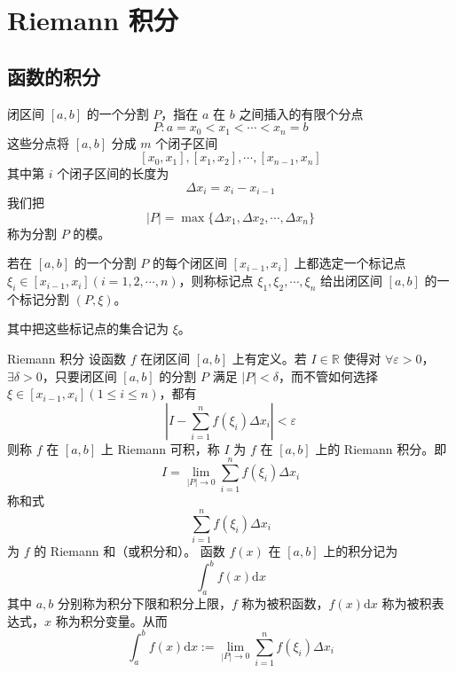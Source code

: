 \chapter{Riemann 积分}


\section{函数的积分}

\begin{definition}
    闭区间 $[a, b]$ 的一个分割 $P$，指在 $a$ 在 $b$ 之间插入的有限个分点
    \[P : a = x_0 < x_1 < \cdots < x_n = b\]
    这些分点将 $[a, b]$ 分成 $m$ 个闭子区间
    \[[x_0,x_1],[x_1,x_2],\cdots,[x_{n -1},x_n]\]
    其中第 $i$ 个闭子区间的长度为
    \[\Delta x_i = x_i - x_{i - 1}\]
    我们把
    \[|P| = \max\{\Delta x_1,\Delta x_2,\cdots,\Delta x_n\}\]
    称为分割 $P$ 的模。
\end{definition}

\begin{definition}
    若在 $[a, b]$ 的一个分割 $P$ 的每个闭区间 $[x_{i - 1}, x_i]$ 上都选定一个标记点 $\xi_i \in [x_{i -1}, x_i](i = 1,2,\cdots,n)$，则称标记点 $\xi_1,\xi_2,\cdots,\xi_n$ 给出闭区间 $[a, b]$ 的一个标记分割 $(P,\xi)$。

    其中把这些标记点的集合记为 $\xi$。
\end{definition}

\begin{definition}{Riemann 积分}
    设函数 $f$ 在闭区间 $[a, b]$ 上有定义。若 $I \in \mathbb{R}$ 使得对 $\forall \varepsilon > 0$，$\exists \delta > 0$，只要闭区间 $[a, b]$ 的分割 $P$ 满足 $|P| < \delta$，而不管如何选择 $\xi \in [x_{i - 1}, x_i](1 \leqslant i \leqslant n)$，都有
    \[|I - \sum_{i =1}^{n}f(\xi_i)\Delta x_i| < \varepsilon\]
    则称 $f$ 在 $[a, b]$ 上 Riemann 可积，称 $I$ 为 $f$ 在 $[a, b]$ 上的 Riemann 积分。即
    \[I = \lim_{|P| \to 0}\sum_{i = 1}^{n}f(\xi_i)\Delta x_i\]
    称和式
    \[\sum_{i = 1}^{n}f(\xi_i)\Delta x_i\]
    为 $f$ 的 Riemann 和（或积分和）。
    函数 $f(x)$ 在 $[a, b]$ 上的积分记为
    \[\int_a^b f(x)\mathrm{d}x\]
    其中 $a, b$ 分别称为积分下限和积分上限，$f$ 称为被积函数，$f(x)\mathrm{d}x$ 称为被积表达式，$x$ 称为积分变量。从而
    \[\int_a^b f(x)\mathrm{d}x := \lim_{|P| \to 0}\sum_{i = 1}^{n}f(\xi_i)\Delta x_i\]
\end{definition}

